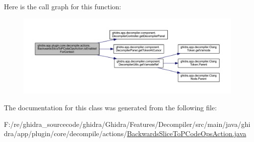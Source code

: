Here is the call graph for this function\+:
\nopagebreak
\begin{figure}[H]
\begin{center}
\leavevmode
\includegraphics[width=350pt]{classghidra_1_1app_1_1plugin_1_1core_1_1decompile_1_1actions_1_1_backwards_slice_to_p_code_ops_action_aec675d76eec5fcc0d1ba30e780e50e02_cgraph}
\end{center}
\end{figure}


The documentation for this class was generated from the following file\+:\begin{DoxyCompactItemize}
\item 
F\+:/re/ghidra\+\_\+sourcecode/ghidra/\+Ghidra/\+Features/\+Decompiler/src/main/java/ghidra/app/plugin/core/decompile/actions/\mbox{\hyperlink{_backwards_slice_to_p_code_ops_action_8java}{Backwards\+Slice\+To\+P\+Code\+Ops\+Action.\+java}}\end{DoxyCompactItemize}
